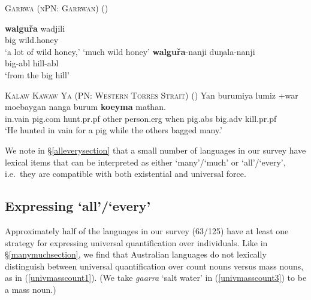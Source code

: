 \documentclass[12pt,egregdoesnotlikesansseriftitles]{scrartcl}
\makeatletter
\newcommand{\ofy}{/125} %
\makeatother
\begin{document}
\begin{exe}
  \ex \textsc{Garrwa (nPN: Garrwan)} (\citealt{furby77}) \label{bigquant1}
  \begin{xlist}
    \ex \gll \textbf{walgu\v{r}a} wadjili \\
    big wild.honey\\
    \glt `a lot of wild honey,' `much wild honey' %
    \ex \gll \textbf{walgu\v{r}a}-nanji duŋala-nanji\\
    big-{\sc abl} hill-{\sc abl}\\
    \glt `from the big hill' %
\end{xlist}    
  \ex \textsc{Kalaw Kawaw Ya (PN: Western Torres Strait)} (\citealt[141]{fo91}) \label{bigquant2}
  \gll Yan burumiya lumiz +war moebaygan nanga burum        \textbf{koeyma}    mathan.\\
  in.vain pig.{\sc com} hunt.{\sc pr.pf} other person.{\sc erg} when   pig.{\sc abs}    big.{\sc adv}    kill.{\sc pr.pf}\\
  \glt `He hunted in vain for a pig while the others bagged many.'
  
\end{exe}

We note in \S\ref{alleverysection} that a small number of languages in our survey have lexical items that can be interpreted as either `many'/`much' or `all'/`every', i.e.\ they are compatible with both existential and universal force.

\subsection{Expressing `all'/`every' \label{alleverysection}}

Approximately half of the languages in our survey (63\ofy) have at least one strategy for expressing universal quantification over individuals. Like in \S\ref{manymuchsection}, we find that Australian languages do not lexically distinguish between universal quantification over count nouns versus mass nouns, as in (\ref{univmasscount1}). (We take \textit{gaarra} `salt water' in (\ref{univmasscount3}) to be a mass noun.)
\end{document}
